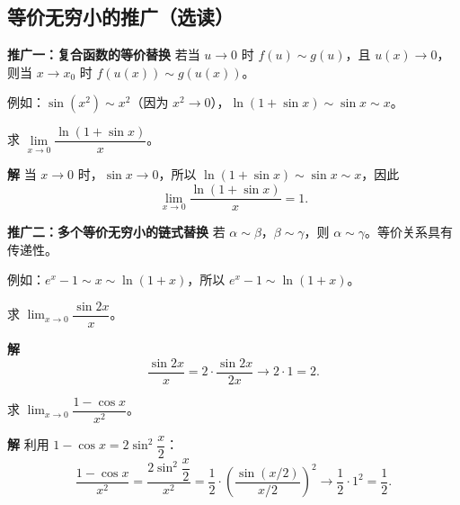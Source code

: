 \documentclass[fontset=fandol]{ctexart}
\newenvironment{extra}{\begin{mdframed}[style=extrastyle, frametitle={* 选读内容（不要求掌握）}]}{\end{mdframed}}
\newenvironment{custom}[1]{\par\noindent\textbf{#1}\quad}{\par\vspace{0.8em}}
\begin{document}
\begin{extra}
\subsection*{等价无穷小的推广（选读）}

\begin{custom}{推广一：复合函数的等价替换}
若当 \(u \to 0\) 时 \(f(u) \sim g(u)\)，且 \(u(x) \to 0\)，则当 \(x \to x_0\) 时 \(f(u(x)) \sim g(u(x))\)。

例如：\(\sin(x^2) \sim x^2\)（因为 \(x^2 \to 0\)），\(\ln(1+\sin x) \sim \sin x \sim x\)。

\begin{example}
求 \(\lim\limits_{x \to 0} \dfrac{\ln(1 + \sin x)}{x}\)。
\end{example}
\begin{custom}{解}
当 \(x \to 0\) 时，\(\sin x \to 0\)，所以 \(\ln(1+\sin x) \sim \sin x \sim x\)，因此
\[
\lim_{x \to 0} \dfrac{\ln(1+\sin x)}{x} = 1.
\]
\end{custom}
\end{custom}

\begin{custom}{推广二：多个等价无穷小的链式替换}
若 \(\alpha \sim \beta\)，\(\beta \sim \gamma\)，则 \(\alpha \sim \gamma\)。等价关系具有传递性。

例如：\(e^x - 1 \sim x \sim \ln(1+x)\)，所以 \(e^x - 1 \sim \ln(1+x)\)。
\end{custom}
\end{extra}

\begin{example}
求 \(\lim_{x \to 0} \dfrac{\sin 2x}{x}\)。
\end{example}

\begin{custom}{解}
\[
\dfrac{\sin 2x}{x} = 2 \cdot \dfrac{\sin 2x}{2x} \to 2 \cdot 1 = 2.
\]
\end{custom}

\begin{example}
求 \(\lim_{x \to 0} \dfrac{1 - \cos x}{x^2}\)。
\end{example}

\begin{custom}{解}
利用 \(1 - \cos x = 2 \sin^2 \dfrac{x}{2}\)：
\[
\dfrac{1 - \cos x}{x^2} = \dfrac{2 \sin^2 \dfrac{x}{2}}{x^2} = \dfrac{1}{2} \cdot \left( \dfrac{\sin (x/2)}{x/2} \right)^2 \to \dfrac{1}{2} \cdot 1^2 = \dfrac{1}{2}.
\]
\end{custom}
\end{document}
